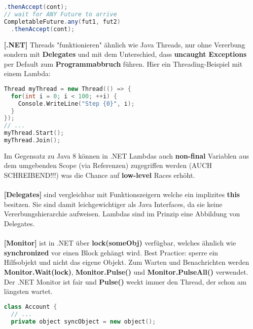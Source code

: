 \documentclass[8pt]{extarticle}
\let\oldtextbf\textbf
\renewcommand{\textbf}{\tiny\oldtextbf}
\begin{document}
\begin{multicols*}{5}
\begin{lstlisting}[language=java]
  .thenAccept(cont);
// wait for ANY Future to arrive
CompletableFuture.any(fut1, fut2)
  .thenAccept(cont);
\end{lstlisting}
\textbf{[.NET]} Threads "funktionieren" ähnlich wie Java Threads, nur ohne Vererbung sondern mit \textbf{Delegates} und mit dem Unterschied, dass \textbf{uncaught Exceptions} per Default zum \textbf{Programmabbruch} führen. Hier ein Threading-Beispiel mit einem Lambda:
\begin{lstlisting}[language=c++]
Thread myThread = new Thread(() => {
  for(int i = 0; i < 100; ++i) {
    Console.WriteLine("Step {0}", i);
  }
});
// ...
myThread.Start();
myThread.Join();
\end{lstlisting}
Im Gegensatz zu Java 8 können in .NET Lambdas auch \textbf{non-final} Variablen aus dem umgebenden Scope (via Referenzen) zugegriffen werden (AUCH SCHREIBEND!!!) was die Chance auf \textbf{low-level} Races erhöht.\\\\
\textbf{[Delegates]} sind vergleichbar mit Funktionszeigern welche ein implizites \textbf{this} besitzen. Sie sind damit leichgewichtiger als Java Interfaces, da sie keine Vererbungshierarchie aufweisen. Lambdas sind im Prinzip eine Abbildung von Delegates.\\\\
\textbf{[Monitor]} ist in .NET über \textbf{lock(someObj)} verfügbar, welches ähnlich wie \textbf{synchronized} vor einen Block gehängt wird. Best Practice: sperre ein Hilfsobjekt und nicht das eigene Objekt. Zum Warten und Benachrichten werden \textbf{Monitor.Wait(lock)}, \textbf{Monitor.Pulse()} und \textbf{Monitor.PulseAll()} verwendet. Der .NET Monitor ist fair und \textbf{Pulse()} weckt immer den Thread, der schon am längsten wartet.
\begin{lstlisting}[language=c++]
class Account {
  // ...
  private object syncObject = new object();


\end{lstlisting}
\end{multicols*}
\end{document}
